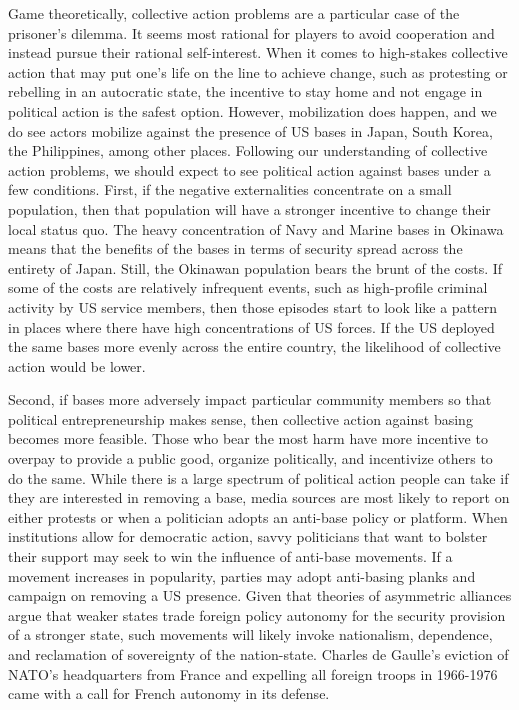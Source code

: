 Game theoretically, collective action problems are a particular case of the prisoner's dilemma. It seems most rational for players to avoid cooperation and instead pursue their rational self-interest. When it comes to high-stakes collective action that may put one's life on the line to achieve change, such as protesting or rebelling in an autocratic state, the incentive to stay home and not engage in political action is the safest option.\autocite{lichbach1993} However, mobilization does happen, and we do see actors mobilize against the presence of US bases in Japan, South Korea, the Philippines, among other places.\autocite{lutz2009} Following our understanding of collective action problems, we should expect to see political action against bases under a few conditions. First, if the negative externalities concentrate on a small population, then that population will have a stronger incentive to change their local status quo. The heavy concentration of Navy and Marine bases in Okinawa means that the benefits of the bases in terms of security spread across the entirety of Japan. Still, the Okinawan population bears the brunt of the costs.\autocite{akibayashi2009} If some of the costs are relatively infrequent events, such as high-profile criminal activity by US service members, then those episodes start to look like a pattern in places where there have high concentrations of US forces. If the US deployed the same bases more evenly across the entire country, the likelihood of collective action would be lower.

Second, if bases more adversely impact particular community members so that political entrepreneurship makes sense, then collective action against basing becomes more feasible. Those who bear the most harm have more incentive to overpay to provide a public good, organize politically, and incentivize others to do the same. While there is a large spectrum of political action people can take if they are interested in removing a base, media sources are most likely to report on either protests or when a politician adopts an anti-base policy or platform. When institutions allow for democratic action, savvy politicians that want to bolster their support may seek to win the influence of anti-base movements. If a movement increases in popularity, parties may adopt anti-basing planks and campaign on removing a US presence. Given that theories of asymmetric alliances argue that weaker states trade foreign policy autonomy for the security provision of a stronger state, such movements will likely invoke nationalism, dependence, and reclamation of sovereignty of the nation-state. Charles de Gaulle's eviction of NATO's headquarters from France and expelling all foreign troops in 1966-1976 came with a call for French autonomy in its defense.

